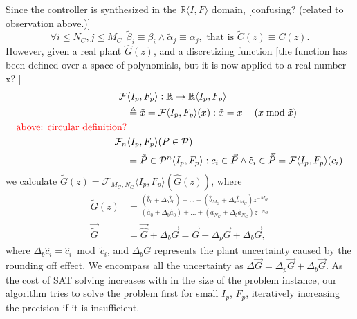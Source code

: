 \documentclass[final]{sig-alternate-05-2015}
\newcommand{\red}[1]{{\color{red}#1}}
\begin{document}
Since the controller is synthesized in the $\mathbb{R}\langle I,F \rangle$
domain, 
\red{[confusing? (related to observation above.)]}
%
$$
\forall i \leq N_C, j \leq M_C\ \  \tilde \beta_{i} \equiv \beta_{i} \wedge \tilde \alpha_{j} \equiv \alpha_{j}, \text{ that is } \tilde C(z) \equiv C(z). 
$$
%
However, given a real plant $\hat{G}(z)$, and a discretizing function 
\red{[the function has been defined over a space of polynomials, but it is now applied to a real number x? ]}
%
\begin{align}
\small
\mathcal{F}&\langle I_p,F_p \rangle : \mathbb{R} \rightarrow  \mathbb{R}\langle I_p,F_p \rangle\\
&\triangleq \tilde x = \mathcal{F}\langle I_p,F_p \rangle(x) : \tilde x=x-(x\bmod\tilde x)\nonumber\\ 
\red{\text{above: circular definition?}}\\
\mathcal{F}_n&\langle I_p,F_p \rangle(P \in \mathcal{P}) \\
&=\tilde P \in \mathcal{P}^{n}\langle I_p,F_p \rangle : c_i \in \vec{P} \wedge \tilde c_i \in \vec{\tilde{P}}=\mathcal{F}\langle I_p,F_p \rangle(c_i)  \nonumber
\end{align}
%
we calculate $\tilde G(z)=\mathcal{F}_{M_G,N_G}\langle I_p,F_p \rangle(\hat{G}(z))$, where 
%
\begin{align}
%
\label{digital_plant_tf}
\tilde G(z)&=\frac{(\hat{b}_{0}+\Delta_b \hat{b}_{0}) +...+(\hat{b}_{M_G}+\Delta_b \hat{b}_{M_G})z^{-M_G}}{(\hat{a}_{0}+\Delta_b \hat{a}_{0})+...+(\hat{a}_{N_G}+\Delta_b \hat{a}_{N_G})z^{-N_G}} \nonumber \\
\vec{\tilde G} &=\vec{\hat{G}}+\Delta_b{\vec{G}}=\vec{G}+\Delta_p{\vec{G}}+\Delta_b{\vec{G}}, 
\end{align}
%
where $\Delta_b\hat{c}_i=\hat{c}_i\bmod \tilde{c}_i$, 
and $\Delta_b{G}$ represents the plant uncertainty caused by
the rounding off effect.  We encompass all the uncertainty as
$\Delta{\vec{G}}=\Delta_p{\vec{G}}+\Delta_b{\vec{G}}$. 
%
As the cost of SAT solving increases with in the size of the problem
instance, our algorithm tries to solve the problem first for small $I_p$,
$F_p$, iteratively increasing the precision if it is insufficient.
\end{document}
